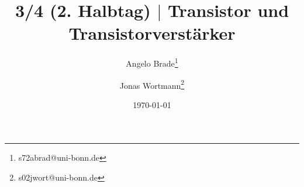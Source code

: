 \documentclass[a4paper,10pt]{article}
\numberwithin{equation}{section}
\begin{document}

\begin{titlepage}
        \title{3/4 (2. Halbtag) $|$ Transistor und Transistorverstärker}
        \author[1]{Angelo Brade\thanks{s72abrad@uni-bonn.de}}
        \author[1]{Jonas Wortmann\thanks{s02jwort@uni-bonn.de}}
        \date{\today}
\end{titlepage}

\maketitle
{}


\clearpage


\fancyhead[R]{\leftmark}
\fancyhead[L]{\thepage}
\fancyfoot[C]{}

\tableofcontents


\clearpage


\end{document}
